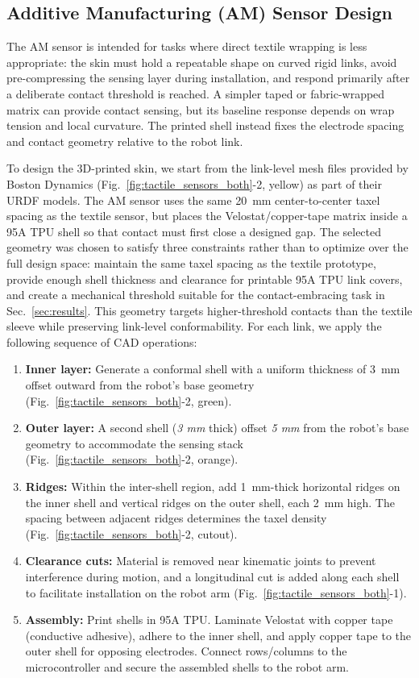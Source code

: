 \subsection{Additive Manufacturing (AM) Sensor Design}
The AM sensor is intended for tasks where direct textile wrapping is less appropriate: the skin must hold a repeatable shape on curved rigid links, avoid pre-compressing the sensing layer during installation, and respond primarily after a deliberate contact threshold is reached. A simpler taped or fabric-wrapped matrix can provide contact sensing, but its baseline response depends on wrap tension and local curvature. The printed shell instead fixes the electrode spacing and contact geometry relative to the robot link.

To design the 3D-printed skin, we start from the link-level mesh files provided by Boston Dynamics (Fig.~\ref{fig:tactile_sensors_both}-2, yellow) as part of their URDF models. The AM sensor uses the same 20~mm center-to-center taxel spacing as the textile sensor, but places the Velostat/copper-tape matrix inside a 95A TPU shell so that contact must first close a designed gap. The selected geometry was chosen to satisfy three constraints rather than to optimize over the full design space: maintain the same taxel spacing as the textile prototype, provide enough shell thickness and clearance for printable 95A TPU link covers, and create a mechanical threshold suitable for the contact-embracing task in Sec.~\ref{sec:results}. This geometry targets higher-threshold contacts than the textile sleeve while preserving link-level conformability. For each link, we apply the following sequence of CAD operations:

\begin{enumerate}[leftmargin=*]
\item \textbf{Inner layer:} Generate a conformal shell with a uniform thickness of 3~mm offset outward from the robot's base geometry (Fig.~\ref{fig:tactile_sensors_both}-2, green).
\item \textbf{Outer layer:} A second shell (\textit{3 mm} thick) offset \textit{5 mm} from the robot’s base geometry to accommodate the sensing stack (Fig.~\ref{fig:tactile_sensors_both}-2, orange).
\item \textbf{Ridges:} Within the inter-shell region, add 1~mm-thick horizontal ridges on the inner shell and vertical ridges on the outer shell, each 2~mm high. The spacing between adjacent ridges determines the taxel density (Fig.~\ref{fig:tactile_sensors_both}-2, cutout).
\item \textbf{Clearance cuts:} Material is removed near kinematic joints to prevent interference during motion, and a longitudinal cut is added along each shell to facilitate installation on the robot arm (Fig.~\ref{fig:tactile_sensors_both}-1).
\item \textbf{Assembly:} Print shells in 95A TPU. Laminate Velostat with copper tape (conductive adhesive), adhere to the inner shell, and apply copper tape to the outer shell for opposing electrodes. Connect rows/columns to the microcontroller and secure the assembled shells to the robot arm.
\end{enumerate}


